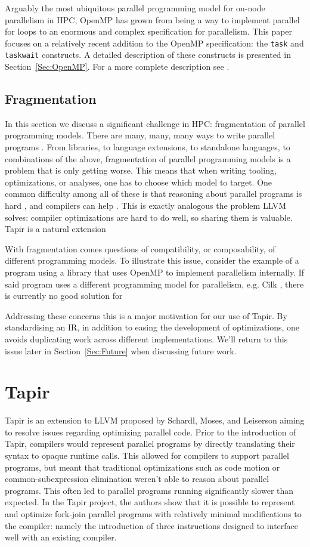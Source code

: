 \documentclass[sigconf]{acmart}
\begin{document}
Arguably the most ubiquitous parallel programming model for on-node parallelism
in HPC, OpenMP has grown from being a way to implement parallel for loops to an
enormous and complex specification for parallelism. This paper focuses on a 
relatively recent addition to the OpenMP specification: the \texttt{task}
and \texttt{taskwait} constructs. A detailed description of these constructs
is presented in Section~\ref{Sec:OpenMP}. For a more complete description see
\cite{spec}.

\subsection{Fragmentation}

In this section we discuss a significant challenge in HPC: fragmentation of
parallel programming models. There are many, many, many ways to write
parallel programs \cite{....}. From libraries, to language extensions, to
standalone languages, to combinations of the above, fragmentation of parallel
programming models is a problem that is only getting worse. This means that
when writing tooling, optimizations, or analyses, one has to choose which model
to target. One common difficulty among all of these is that reasoning about
parallel programs is hard \cite{}, and compilers can help \cite{}. This is
exactly analogous the problem LLVM solves: compiler optimizations are
hard to do well, so sharing them is valuable. Tapir is a natural extension 

With fragmentation comes questions of compatibility, or composability, of 
different programming models. To illustrate this issue, consider the example of
a program using a library that uses OpenMP to implement parallelism internally. 
If said program uses a different programming model for parallelism, e.g. Cilk
, there is currently no good solution for 

Addressing these concerns this is a major motivation for our use of Tapir.
By standardising an IR, in addition to easing the development of optimizations,
one avoids duplicating work across different implementations. We'll return to
this issue later in Section~\ref{Sec:Future} when discussing future work.

\section{Tapir} \label{Sec:Tapir}
Tapir is an extension to LLVM proposed by Schardl, Moses, and Leiserson
aiming to resolve issues regarding optimizing parallel code. Prior to
the introduction of Tapir, compilers would represent parallel programs
by directly translating their syntax to opaque runtime calls. This allowed
for compilers to support parallel programs, but meant that traditional 
optimizations such as code motion \cite{} or common-subexpression elimination \cite{}
weren't able to reason about parallel programs. This often led to parallel
programs running significantly slower than expected. In the Tapir project,
the authors show that it is possible to represent and optimize fork-join
parallel programs with relatively minimal modifications to the compiler: namely
the introduction of three instructions designed to interface well with an
existing compiler.
\end{document}
